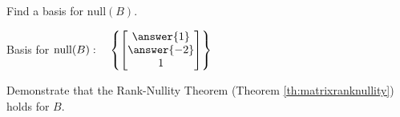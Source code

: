 \documentclass{ximera}
\begin{document}
\begin{problem}
\begin{question}
    Find a basis for $\mbox{null}(B)$.

Basis for $\mbox{null}(B):\quad \left\{ \begin{bmatrix}\answer{1}\\\answer{-2}\\1\end{bmatrix}\right\}$

Demonstrate that the Rank-Nullity Theorem (Theorem \ref{th:matrixranknullity}) holds for $B$.
\end{question}
\end{problem}



\end{document}
